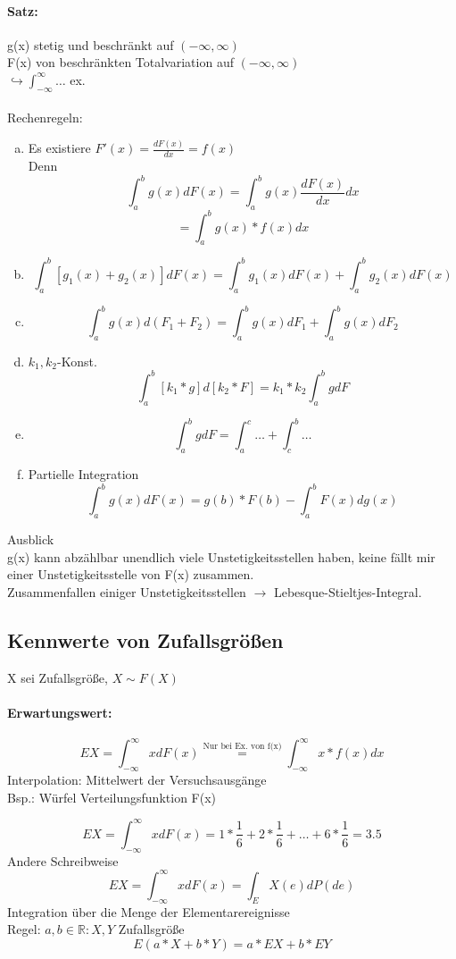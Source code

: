 \documentclass[a4paper,12pt]{scrartcl}
\begin{document}
\paragraph{Satz:} 
g(x) stetig und beschränkt auf $(-\infty,\infty)$\\
F(x) von beschränkten Totalvariation auf $(-\infty,\infty)$\\
$\hookrightarrow \int^{\infty}_{-\infty}\dots$ ex.\\
\\
Rechenregeln:
\begin{enumerate}[(a)]
 \item Es existiere $F'(x) = \frac{dF(x)}{dx}=f(x)$\\
 Denn $$\int^b_a g(x) dF(x) = \int^b_a g(x) \frac{dF(x)}{dx}dx $$
 $$=\int^b_a g(x)*f(x)dx $$
 \item $$\int^b_a[g_1(x)+g_2(x)]dF(x) = \int^b_a g_1(x)dF(x) + \int^b_a g_2(x) dF(x)$$
 \item $$\int^b_a g(x) d(F_1+F_2) = \int^b_a g(x) dF_1 + \int^b_a g(x) dF_2 $$
 \item $k_1, k_2$-Konst.
  $$\int^b_a [k_1*g]d[k_2*F] = k_1*k_2\int^b_a gdF $$
 \item $$\int^b_a gdF=\int^c_a\dots + \int^b_c\dots $$
 \item Partielle Integration $$\int^b_a g(x) dF(x) = g(b)*F(b)-\int^b_a F(x) dg(x) $$
\end{enumerate}
Ausblick\\
g(x) kann abzählbar unendlich viele Unstetigkeitsstellen haben, keine fällt mir einer Unstetigkeitsstelle von F(x) zusammen.\\
Zusammenfallen einiger Unstetigkeitsstellen $\rightarrow$ Lebesque-Stieltjes-Integral.

\subsection{Kennwerte von Zufallsgrößen}

X sei Zufallsgröße, $X\sim F(X)$\\
\paragraph{Erwartungswert:}
$$EX = \int^{\infty}_{-\infty} x dF(x) \overset{\text{Nur bei Ex. von f(x)}}{=} \int^{\infty}_{-\infty} x* f(x) dx$$
Interpolation: Mittelwert der Versuchsausgänge\\
Bsp.: Würfel Verteilungsfunktion F(x)

$$EX = \int^{\infty}_{-\infty} x dF(x) = 1*\frac{1}{6}+2*\frac{1}{6}+\dots+6*\frac{1}{6} = 3.5 $$
Andere Schreibweise
$$EX = \int^{\infty}_{-\infty} xdF(x) = \int_E X(e)dP(de) $$
Integration über die Menge der Elementarereignisse\\
Regel: $a,b \in \mathbb{R}: X,Y $ Zufallsgröße
$$E(a*X + b*Y) = a* EX + b*EY $$
\end{document}

